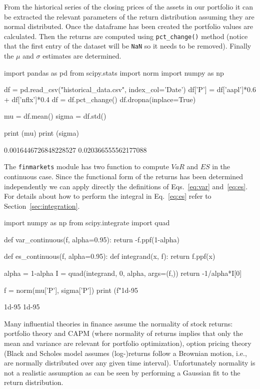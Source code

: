 From the historical series of the closing prices of the assets in our portfolio it can be extracted the relevant parameters of the return distribution assuming they are normal distributed.
Once the dataframe has been created the portfolio values are calculated. Then the returns are computed using \texttt{pct\_change()} method (notice that the first entry of the dataset will be \texttt{NaN} so it needs to be removed).
Finally the $\mu$ and $\sigma$ estimates are determined.

\begin{ipython}
import pandas as pd
from scipy.stats import norm
import numpy as np

df = pd.read_csv("historical_data.csv", index_col='Date')
df['P'] = df['aapl']*0.6 + df['nflx']*0.4
df = df.pct_change()
df.dropna(inplace=True)

mu = df.mean() 
sigma = df.std()

print (mu)
print (sigma)
\end{ipython}
\begin{ioutput}
0.0016446726848228527
0.020366555562177088
\end{ioutput}
\noindent
\begin{finmarkets}
The \texttt{finmarkets} module has two function to compute $VaR$ and $ES$ in the continuous case.
Since the functional form of the returns has been determined independently we can apply directly the definitions of  Eqs.~\ref{eq:var} and~\ref{eq:es}. 
For details about how to perform the integral in Eq.~\ref{eq:es} refer to Section~\ref{sec:integration}.
\end{finmarkets}

\begin{ipython}
import numpy as np
from scipy.integrate import quad

def var_continuous(f, alpha=0.95):
    return -f.ppf(1-alpha)

def es_continuous(f, alpha=0.95):
  def integrand(x, f):
    return f.ppf(x)

  alpha = 1-alpha
  I = quad(integrand, 0, alpha, args=(f,))
  return -1/alpha*I[0]
    
f = norm(mu['P'], sigma['P'])
print (f"1d-95%
\end{ipython}
\begin{ioutput}
1d-95%
1d-95%
\end{ioutput}

Many influential theories in finance assume the normality of stock returns: portfolio theory and CAPM (where normality of returns implies that
only the mean and variance are relevant for portfolio optimization), option pricing theory (Black and Scholes model assumes (log-)returns follow a Brownian motion, i.e., are normally distributed over any given time interval).
Unfortunately normality is not a realistic assumption as can be seen by performing a Gaussian fit to the return distribution.

